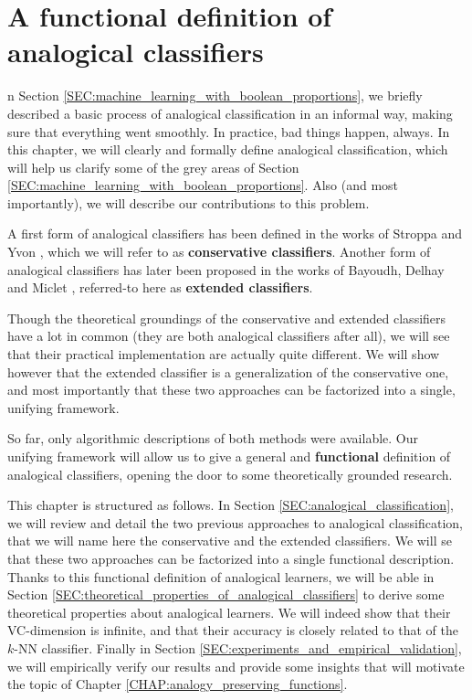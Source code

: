 \chapter{A functional definition of analogical classifiers}
\label{CHAP:functional_definition}
\localtableofcontents*
\vspace*{\baselineskip}

n Section \ref{SEC:machine_learning_with_boolean_proportions}, we
briefly described a basic process of analogical classification in an informal
way, making sure that everything went smoothly. In practice, bad things happen,
always. In this chapter, we will clearly and formally define analogical
classification, which will help us clarify some of the grey areas of Section
\ref{SEC:machine_learning_with_boolean_proportions}. Also (and most
importantly), we will describe our contributions to this problem.

A first form of analogical classifiers has been defined in the works of Stroppa
and Yvon \cite{StrYvoCNLL05}, which we will refer to as \textbf{conservative
classifiers}. Another form of analogical classifiers has later been proposed in
the works of Bayoudh, Delhay and Miclet \cite{MicBayDelJAIR08,
BayMicDelIJCAI07}, referred-to here as \textbf{extended classifiers}.

Though the theoretical groundings of the conservative and extended
classifiers have a lot in common (they are both analogical classifiers after
all), we will see that their practical implementation are actually quite
different. We will show however that the extended classifier is a
generalization of the conservative one, and most importantly that these two
approaches can be factorized into a single, unifying framework.

So far, only algorithmic descriptions of both methods were available. Our
unifying framework will allow us to give a general and \textbf{functional}
definition of analogical classifiers, opening the door to some theoretically
grounded research.

This chapter is structured as follows. In Section
\ref{SEC:analogical_classification}, we will review and detail the two previous
approaches to analogical classification, that we will name here the
conservative and the extended classifiers. We will se that these two approaches
can be factorized into a single functional description. Thanks to this
functional definition of analogical learners, we will be able in Section
\ref{SEC:theoretical_properties_of_analogical_classifiers} to derive some
theoretical properties about analogical learners. We will indeed show that
their VC-dimension is infinite, and that their accuracy is closely related to
that of the $k$-NN classifier. Finally in Section
\ref{SEC:experiments_and_empirical_validation}, we will empirically verify our
results and provide some insights that will motivate the topic of Chapter
\ref{CHAP:analogy_preserving_functions}.

